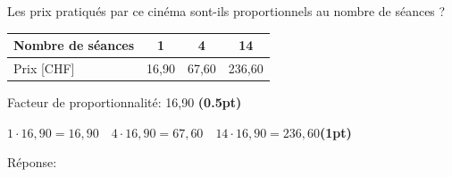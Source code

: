 
\question[2]
Les prix pratiqués par ce cinéma sont-ils proportionnels au nombre de séances ?

\def\arraystretch{1.5}
\begin{center}\begin{tabularx}{0.5\textwidth}{l|C|C|C|}
Nombre de séances &1&4&14\\
\hline
Prix [CHF]&16,90&67,60&236,60\\
\end{tabularx}\end{center}
\def\arraystretch{1.5}

\vspace{10pt}{\footnotesize\raggedleft Espace pour ta démarche et tes calculs\par}
\begin{solutionorgrid}[140pt]

\vspace{5pt}Facteur de proportionnalité: 16,90 \hfill\textbf{(0.5pt)}

\vspace{5pt}$1 \cdot 16,90 = 16,90 \quad 4 \cdot 16,90 = 67,60 \quad 14 \cdot 16,90 = 236,60$\hfill\textbf{(1pt)}
\end{solutionorgrid}

\begin{tcolorbox}[enhanced jigsaw, interior hidden, colframe=box, parbox=false]%
Réponse: 
\end{tcolorbox}

